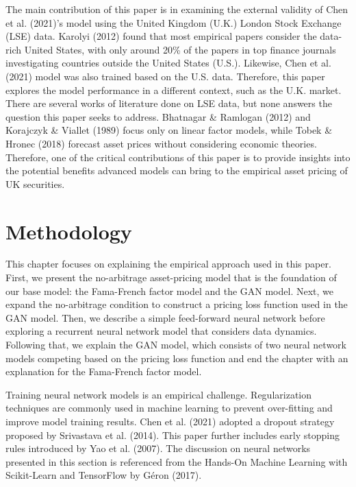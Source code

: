 \documentclass[12pt]{article}
\begin{document}
The main contribution of this paper is in examining the
external validity of Chen et al. (2021)'s model using the
United Kingdom (U.K.) London Stock Exchange (LSE) data.
Karolyi (2012) found that most
empirical papers consider the data-rich United States, with
only around 20\% of the papers in top finance journals
investigating countries outside the United States (U.S.).
Likewise, Chen et al. (2021) model was also
trained based on the U.S. data.
Therefore, this paper explores the model performance in a
different context, such as the U.K. market.
There are several works of literature done on LSE data,
but none answers the question this paper seeks to address.
Bhatnagar \& Ramlogan (2012) and
Korajczyk \& Viallet (1989) focus only on
linear factor models, while Tobek \& Hronec (2018)
forecast asset prices without considering economic theories.
Therefore, one of the critical contributions of this paper
is to provide insights into the potential benefits advanced
models can bring to the empirical asset pricing of UK
securities.

\hypertarget{methodology}{%
\section{Methodology}\label{methodology}}

\thispagestyle{plain}

This chapter focuses on explaining the empirical approach used in this
paper. First, we present the no-arbitrage asset-pricing
model that is the foundation of our base model: the
Fama-French factor model and the GAN model. Next, we
expand the no-arbitrage condition to construct a pricing
loss function used in the GAN model. Then, we describe a
simple feed-forward neural network before exploring a
recurrent neural network model that considers data dynamics.
Following that, we explain the GAN model, which
consists of two neural network models competing based on the
pricing loss function and end the chapter
with an explanation for the Fama-French factor model.

Training neural network models is an empirical challenge.
Regularization techniques are commonly used in machine
learning to prevent over-fitting and improve model training
results. Chen et al. (2021) adopted a dropout strategy proposed
by Srivastava et al. (2014).
This paper further includes early stopping rules introduced
by Yao et al. (2007).
The discussion on neural networks presented in this section
is referenced from the
Hands-On Machine Learning with Scikit-Learn and TensorFlow
by Géron (2017).
\end{document}
